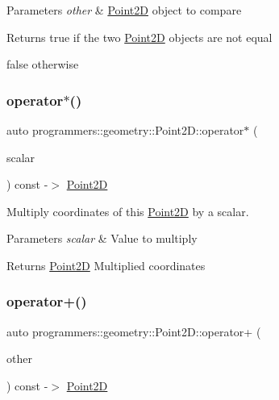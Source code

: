 \begin{DoxyParams}{Parameters}
{\em other} & \hyperlink{classprogrammers_1_1geometry_1_1Point2D}{Point2D} object to compare \\
\hline
\end{DoxyParams}
\begin{DoxyReturn}{Returns}
true if the two \hyperlink{classprogrammers_1_1geometry_1_1Point2D}{Point2D} objects are not equal 

false otherwise 
\end{DoxyReturn}
\mbox{\label{classprogrammers_1_1geometry_1_1Point2D_a5dcc2f602f94d4ebfa71f8d98be3909e}} 
\subsubsection{\texorpdfstring{operator$\ast$()}{operator*()}}
{\footnotesize\ttfamily auto programmers\+::geometry\+::\+Point2\+D\+::operator$\ast$ (\begin{DoxyParamCaption}\item[{double}]{scalar }\end{DoxyParamCaption}) const -\/$>$  \hyperlink{classprogrammers_1_1geometry_1_1Point2D}{Point2D}}



Multiply coordinates of this \hyperlink{classprogrammers_1_1geometry_1_1Point2D}{Point2D} by a scalar. 


\begin{DoxyParams}{Parameters}
{\em scalar} & Value to multiply \\
\hline
\end{DoxyParams}
\begin{DoxyReturn}{Returns}
\hyperlink{classprogrammers_1_1geometry_1_1Point2D}{Point2D} Multiplied coordinates 
\end{DoxyReturn}
\mbox{\label{classprogrammers_1_1geometry_1_1Point2D_a8eec206395faf46be2b4e3048aa5ac31}} 
\subsubsection{\texorpdfstring{operator+()}{operator+()}}
{\footnotesize\ttfamily auto programmers\+::geometry\+::\+Point2\+D\+::operator+ (\begin{DoxyParamCaption}\item[{const \hyperlink{classprogrammers_1_1geometry_1_1Point2D}{Point2D} \&}]{other }\end{DoxyParamCaption}) const -\/$>$  \hyperlink{classprogrammers_1_1geometry_1_1Point2D}{Point2D}}



